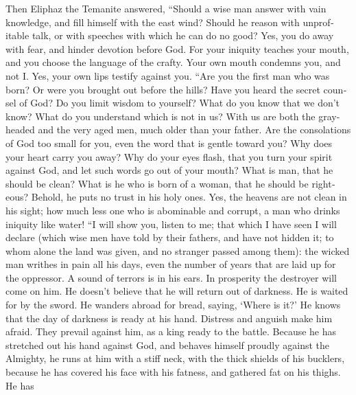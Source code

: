 \begin{paracol}{2}
\begin{otherlanguage}{english}
 Then Eliphaz the Temanite answered, 
``Should a wise man answer with vain knowledge, and fill himself with
the east wind?  Should he reason with unprofitable talk,
or with speeches with which he can do no good?  Yes, you
do away with fear, and hinder devotion before God.  For
your iniquity teaches your mouth, and you choose the language of the
crafty.  Your own mouth condemns you, and not I. Yes, your
own lips testify against you.  ``Are you the first man who
was born? Or were you brought out before the hills?  Have
you heard the secret counsel of God? Do you limit wisdom to yourself?
 What do you know that we don't know? What do you
understand which is not in us?  With us are both the
gray-headed and the very aged men, much older than your father.
 Are the consolations of God too small for you, even the
word that is gentle toward you?  Why does your heart
carry you away? Why do your eyes flash,  that you turn
your spirit against God, and let such words go out of your mouth?
 What is man, that he should be clean? What is he who is
born of a woman, that he should be righteous?  Behold, he
puts no trust in his holy ones. Yes, the heavens are not clean in his
sight;  how much less one who is abominable and corrupt,
a man who drinks iniquity like water!  ``I will show you,
listen to me; that which I have seen I will declare 
(which wise men have told by their fathers, and have not hidden it;
 to whom alone the land was given, and no stranger passed
among them):  the wicked man writhes in pain all his
days, even the number of years that are laid up for the oppressor.
 A sound of terrors is in his ears. In prosperity the
destroyer will come on him.  He doesn't believe that he
will return out of darkness. He is waited for by the sword.
 He wanders abroad for bread, saying, `Where is it?' He
knows that the day of darkness is ready at his hand. 
Distress and anguish make him afraid. They prevail against him, as a
king ready to the battle.  Because he has stretched out
his hand against God, and behaves himself proudly against the Almighty,
 he runs at him with a stiff neck, with the thick shields
of his bucklers,  because he has covered his face with
his fatness, and gathered fat on his thighs.  He has

\end{otherlanguage}
\end{paracol}
